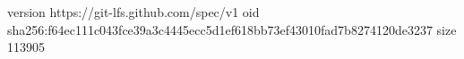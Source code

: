 version https://git-lfs.github.com/spec/v1
oid sha256:f64ec111c043fce39a3c4445ecc5d1ef618bb73ef43010fad7b8274120de3237
size 113905
